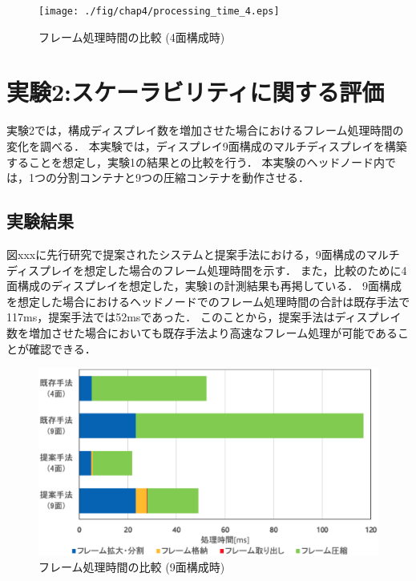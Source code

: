 \begin{figure}[H]
    \hspace*{\fill}
    \texttt{[image: ./fig/chap4/processing\_time\_4.eps]}
    \hspace*{\fill}
    \caption{フレーム処理時間の比較 (4面構成時)}
\end{figure}


\section{実験2:スケーラビリティに関する評価}
実験2では，構成ディスプレイ数を増加させた場合におけるフレーム処理時間の変化を調べる．
本実験では，ディスプレイ9面構成のマルチディスプレイを構築することを想定し，実験1の結果との比較を行う．
本実験のヘッドノード内では，1つの分割コンテナと9つの圧縮コンテナを動作させる．

 \subsection*{実験結果}
 図xxxに先行研究で提案されたシステムと提案手法における，9面構成のマルチディスプレイを想定した場合のフレーム処理時間を示す．
 また，比較のために4面構成のディスプレイを想定した，実験1の計測結果も再掲している．
 9面構成を想定した場合におけるヘッドノードでのフレーム処理時間の合計は既存手法で117ms，提案手法では52msであった．
 このことから，提案手法はディスプレイ数を増加させた場合においても既存手法より高速なフレーム処理が可能であることが確認できる．

 \begin{figure}[H]
    \hspace*{\fill}
    \includegraphics[width=\linewidth]{./fig/chap4/processing_time_49.eps}
    \hspace*{\fill}
    \caption{フレーム処理時間の比較 (9面構成時)}
\end{figure}

